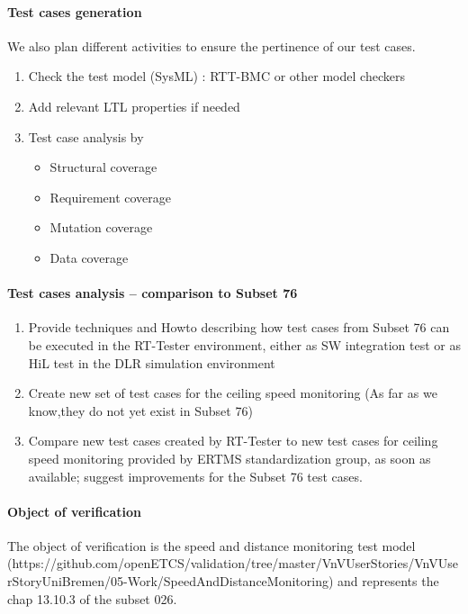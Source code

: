 \paragraph{Test cases generation}
We also plan different activities to ensure the pertinence of our test cases.
\begin{enumerate}
\item Check the test model (SysML) : RTT-BMC or other model checkers
\item Add relevant LTL properties if needed
\item Test case analysis by 
  \begin{itemize}
    \item Structural coverage
    \item Requirement coverage
    \item Mutation coverage 
    \item Data coverage
  \end{itemize}
\end{enumerate}

\paragraph{Test cases analysis -- comparison to Subset 76}
\begin{enumerate}
\item Provide techniques and Howto describing how test cases from
  Subset 76 can be executed in the RT-Tester environment, either as SW
  integration test or as HiL test in the DLR simulation environment
\item Create new set of test cases for the ceiling speed monitoring
  (As far as we know,they do not yet exist in Subset 76)
\item Compare new test cases created by RT-Tester to new test cases
  for ceiling speed monitoring provided by ERTMS standardization
  group, as soon as available; suggest improvements for the Subset 76
  test cases. 
 \end{enumerate}



\paragraph{Object of verification}
\nl
The object of verification is the speed and distance monitoring test model\\
(https://github.com/openETCS/validation/tree/master/VnVUserStories/VnVUserStoryUniBremen/05-Work/SpeedAndDistanceMonitoring)
and represents the chap 13.10.3 of the subset 026.



